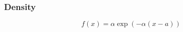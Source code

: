 %
%
%
%



\subsubsection{Density}
\label{ExponentialDistributionDensity}

\begin{equation} 
	f(x)=\alpha \exp(-\alpha (x-a))
\end{equation}


